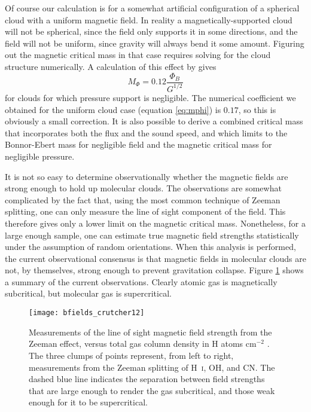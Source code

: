 Of course our calculation is for a somewhat artificial configuration of a spherical cloud with a uniform magnetic field. In reality a magnetically-supported cloud will not be spherical, since the field only supports it in some directions, and the field will not be uniform, since gravity will always bend it some amount. Figuring out the magnetic critical mass in that case requires solving for the cloud structure numerically. A calculation of this effect by \citet{tomisaka98a} gives
\begin{equation}
M_{\Phi} = 0.12\frac{\Phi_B}{G^{1/2}}
\end{equation}
for clouds for which pressure support is negligible. The numerical coefficient we obtained for the uniform cloud case (equation \ref{eq:mphi}) is $0.17$, so this is obviously a small correction. It is also possible to derive a combined critical mass that incorporates both the flux and the sound speed, and which limits to the Bonnor-Ebert mass for negligible field and the magnetic critical mass for negligible pressure.

It is not so easy to determine observationally whether the magnetic fields are strong enough to hold up molecular clouds.  The observations are somewhat complicated by the fact that, using the most common technique of Zeeman splitting, one can only measure the line of sight component of the field. This therefore gives only a lower limit on the magnetic critical mass. Nonetheless, for a large enough sample, one can estimate true magnetic field strengths statistically under the assumption of random orientations. When this analysis is performed, the current observational consensus is that magnetic fields in molecular clouds are not, by themselves, strong enough to prevent gravitation collapse. Figure \ref{fig:bfields} shows a summary of the current observations. Clearly atomic gas is magnetically subcritical, but molecular gas is supercritical.

\begin{figure}
\texttt{[image: bfields\_crutcher12]}
\caption[Magnetic field strength measurements]{
\label{fig:bfields}
Measurements of the line of sight magnetic field strength from the Zeeman effect, versus total gas column density in H atoms cm$^{-2}$ \citep{crutcher12a}. The three clumps of points represent, from left to right, measurements from the Zeeman splitting of H~\textsc{i}, OH, and CN. The dashed blue line indicates the separation between field strengths that are large enough to render the gas subcritical, and those weak enough for it to be supercritical.
}
\end{figure}


